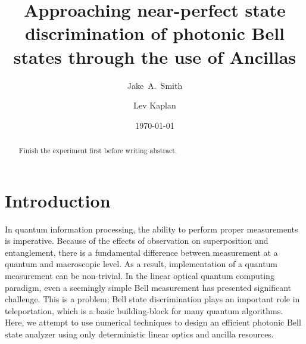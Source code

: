 \documentclass[aps,pra,twocolumn,showpacs,superscriptaddress,floatfix,10pt]{revtex4}
\begin{document}
\newcommand{\beq}{\begin{equation}}
\newcommand{\eeq}{\end{equation}}
\newcommand{\ben}{\begin{eqnarray}}
\newcommand{\een}{\end{eqnarray}}
\newcommand{\bea}{\begin{array}}
\newcommand{\eea}{\end{array}}
\newcommand{\om}{(\omega )}
\newcommand{\bef}{\begin{figure}}
\newcommand{\eef}{\end{figure}}
\newcommand{\leg}[1]{\caption{\protect\rm{\protect\footnotesize{#1}}}}
\newcommand{\ew}[1]{\langle{#1}\rangle}
\newcommand{\be}[1]{\mid\!{#1}\!\mid}
\newcommand{\no}{\nonumber}
\newcommand{\etal}{{\em et~al }}
\newcommand{\geff}{g_{\mbox{\it{\scriptsize{eff}}}}}
\newcommand{\da}[1]{{#1}^\dagger}
\newcommand{\cf}{{\it cf.\/}\ }
\newcommand{\ie}{{\it i.e.\/}\ }   

\newcommand{\spazio}{\vspace{0.3cm}}%
\newcommand{\de}[1]{\frac{\partial}{\partial{#1}}}
\newcommand{\U}{\tilde{U}}
\newcommand{\V}{\tilde{V}}


\title{Approaching near-perfect state discrimination of photonic Bell states through the use of Ancillas}

\author{Jake~A.~Smith}

\author{Lev Kaplan}

 \begin{abstract}
 	Finish the experiment first before writing abstract.
\end{abstract}                                                               
\date{\today}
\pacs{***}
\maketitle
\section{Introduction}
\label{Intro}
In quantum information processing, the ability to perform proper measurements is imperative. Because of the effects of observation on superposition and entanglement, there is a fundamental difference between measurement at a quantum and macroscopic level. As a result, implementation of a quantum measurement can be non-trivial. In the linear optical quantum computing paradigm, even a seemingly simple Bell measurement has presented significant challenge. This is a problem; Bell state discrimination plays an important role in teleportation, which is a basic building-block for many quantum algorithms. Here, we attempt to use numerical techniques to design an efficient photonic Bell state analyzer using only deterministic linear optics and ancilla resources. 
\end{document}
